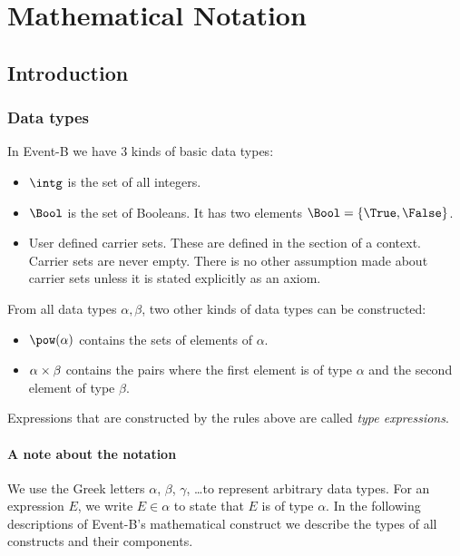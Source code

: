 \section{Mathematical Notation}
\label{mathematical_notation}

\subsection{Introduction}
\label{mathematical_notation_introduction}

\subsubsection{Data types}
\label{data_types}

In Event-B we have 3 kinds of basic data types:
\begin{itemize}
\item {} $\intg$ is the set of all integers.
\item {}
  $\Bool$ is the set of Booleans. 
  It has two elements $\Bool = \{\True,\False\}$.
\item {}
  User defined carrier sets. 
  These are defined in the  section of a context.
  Carrier sets are never empty.
  There is no other assumption made about carrier sets unless it is stated explicitly as
  an axiom.
\end{itemize}
From all data types $\alpha, \beta$, two other kinds of data types can be constructed:
\begin{itemize}
\item $\pow(\alpha)$ contains the sets of elements of $\alpha$.
\item $\alpha\mathbin\times\beta$ contains the pairs where the first element is of type $\alpha$ and the
  second element of type $\beta$.
\end{itemize}
 Expressions that are constructed by the rules above are called \emph{type expressions}.

\paragraph{A note about the notation}
We use the Greek letters $\alpha$, $\beta$, $\gamma$, \ldots to represent arbitrary data types.
For an expression $E$, we write $E\in\alpha$ to state that $E$ is of type $\alpha$.
In the following descriptions of Event-B's mathematical construct we describe the
  types of all constructs and their components.

